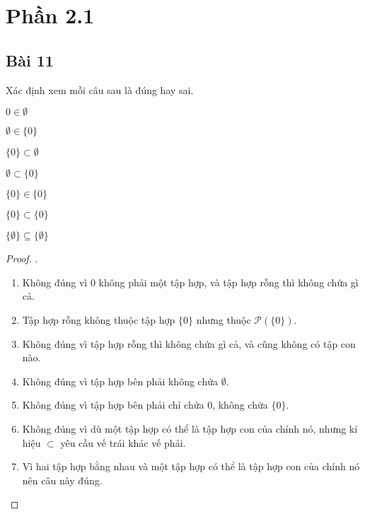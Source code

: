 \section*{Phần 2.1}
\subsection*{Bài 11}
Xác định xem mỗi câu sau là đúng hay sai.
\begin{enumerate}[label=\alph*)]
    \begin{multicols}{2}
        \item $0\in\emptyset$
        \item $\emptyset\in\{0\}$
        \item $\{0\}\subset\emptyset$
        \item $\emptyset\subset\{0\}$
        \item $\{0\}\in\{0\}$
        \item $\{0\}\subset\{0\}$
        \item $\{\emptyset\}\subseteq\{\emptyset\}$
    \end{multicols}
\end{enumerate}
\begin{proof}.
    \begin{enumerate}[label=\alph*)]
        \item Không đúng vì 0 không phải một tập hợp, và tập hợp rỗng thì không chứa gì cả.
        \item Tập hợp rỗng không thuộc tập hợp $\{0\}$ nhưng thuộc $\mathcal{P}(\{0\})$.
        \item Không đúng vì tập hợp rỗng thì không chứa gì cả, và cũng không có tập con nào.
        \item Không đúng vì tập hợp bên phải không chứa $\emptyset$.
        \item Không đúng vì tập hợp bên phải chỉ chứa 0, không chứa $\{0\}$.
        \item Không đúng vì dù một tập hợp có thể là tập hợp con của chính nó, nhưng kí hiệu $\subset$ yêu cầu vế trái khác vế phải.
        \item Vì hai tập hợp bằng nhau và một tập hợp có thể là tập hợp con của chính nó nên câu này đúng.
    \end{enumerate}
\end{proof}
